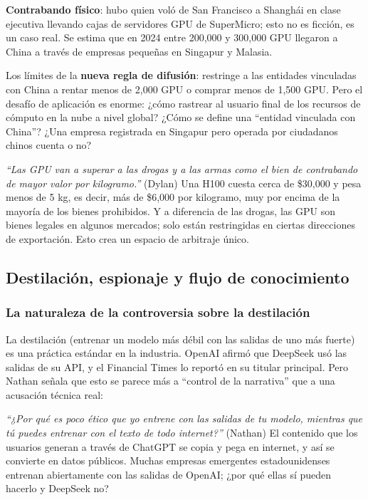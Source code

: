 \documentclass[a4paper]{article}
\begin{document}
\textbf{Contrabando físico}: hubo quien voló de San Francisco a Shanghái en clase ejecutiva llevando cajas de servidores GPU de SuperMicro; esto no es ficción, es un caso real. Se estima que en 2024 entre 200,000 y 300,000 GPU llegaron a China a través de empresas pequeñas en Singapur y Malasia.

Los límites de la \textbf{nueva regla de difusión}: restringe a las entidades vinculadas con China a rentar menos de 2,000 GPU o comprar menos de 1,500 GPU. Pero el desafío de aplicación es enorme: ¿cómo rastrear al usuario final de los recursos de cómputo en la nube a nivel global? ¿Cómo se define una ``entidad vinculada con China''? ¿Una empresa registrada en Singapur pero operada por ciudadanos chinos cuenta o no?

\textit{``Las GPU van a superar a las drogas y a las armas como el bien de contrabando de mayor valor por kilogramo.''} (Dylan) Una H100 cuesta cerca de \$30,000 y pesa menos de 5 kg, es decir, más de \$6,000 por kilogramo, muy por encima de la mayoría de los bienes prohibidos. Y a diferencia de las drogas, las GPU son bienes legales en algunos mercados; solo están restringidas en ciertas direcciones de exportación. Esto crea un espacio de arbitraje único.

\subsection{Destilación, espionaje y flujo de conocimiento}

\subsubsection{La naturaleza de la controversia sobre la destilación}

La destilación (entrenar un modelo más débil con las salidas de uno más fuerte) es una práctica estándar en la industria. OpenAI afirmó que DeepSeek usó las salidas de su API, y el Financial Times lo reportó en su titular principal. Pero Nathan señala que esto se parece más a ``control de la narrativa'' que a una acusación técnica real:

\textit{``¿Por qué es poco ético que yo entrene con las salidas de tu modelo, mientras que tú puedes entrenar con el texto de todo internet?''} (Nathan) El contenido que los usuarios generan a través de ChatGPT se copia y pega en internet, y así se convierte en datos públicos. Muchas empresas emergentes estadounidenses entrenan abiertamente con las salidas de OpenAI; ¿por qué ellas sí pueden hacerlo y DeepSeek no?
\end{document}
